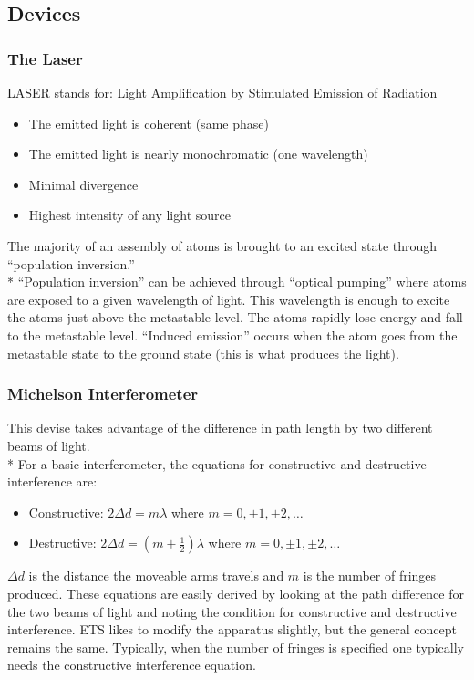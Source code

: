 \subsection{Devices}

\subsubsection{The Laser}
LASER stands for: Light Amplification by Stimulated Emission of Radiation
\begin{itemize}
\item The emitted light is coherent (same phase)
\item The emitted light is nearly monochromatic (one wavelength)
\item Minimal divergence
\item Highest intensity of any light source
\end{itemize}
The majority of an assembly of atoms is brought to an excited state through ``population inversion.''\\*
``Population inversion'' can be achieved through ``optical pumping'' where atoms are exposed to a given wavelength of light.
This wavelength is enough to excite the atoms just above the metastable level.
The atoms rapidly lose energy and fall to the metastable level.
``Induced emission'' occurs when the atom goes from the metastable state to the ground state (this is what produces the light).

\subsubsection{Michelson Interferometer}
This devise takes advantage of the difference in path length by two different beams of light.\\*
For a basic interferometer, the equations for constructive and destructive interference are:
\begin{itemize}
\item Constructive: \(2\Delta d=m\lambda\) where \(m=0,\pm1,\pm2,\ldots\)
\item Destructive: \(2\Delta d=(m+\frac{1}{2})\lambda\) where \(m=0,\pm1,\pm2,\ldots\)
\end{itemize}
\(\Delta d\) is the distance the moveable arms travels and \(m\) is the number of fringes produced.
These equations are easily derived by looking at the path difference for the two beams of light and noting the condition for constructive and destructive interference.
ETS likes to modify the apparatus slightly, but the general concept remains the same.
Typically, when the number of fringes is specified one typically needs the constructive interference equation.

